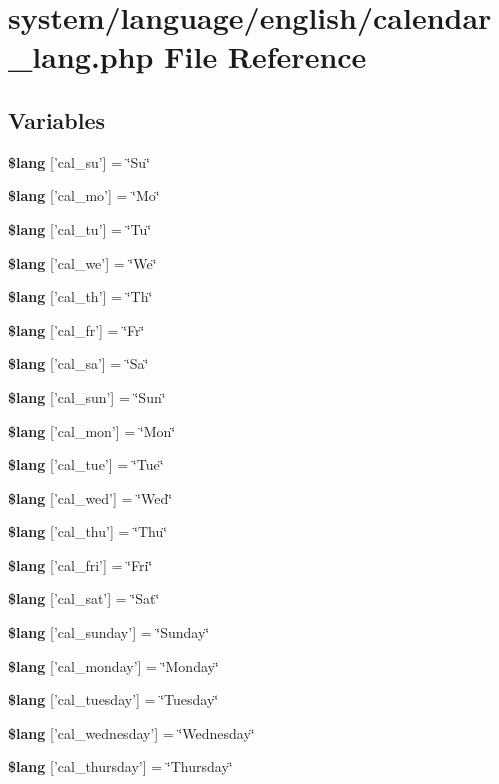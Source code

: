 \section{system/language/english/calendar\-\_\-lang.php File Reference}
\label{calendar__lang_8php}
\subsection*{Variables}
\begin{DoxyCompactItemize}
\item 
{\bf \$lang} ['cal\-\_\-su'] = \char`\"{}Su\char`\"{}
\item 
{\bf \$lang} ['cal\-\_\-mo'] = \char`\"{}Mo\char`\"{}
\item 
{\bf \$lang} ['cal\-\_\-tu'] = \char`\"{}Tu\char`\"{}
\item 
{\bf \$lang} ['cal\-\_\-we'] = \char`\"{}We\char`\"{}
\item 
{\bf \$lang} ['cal\-\_\-th'] = \char`\"{}Th\char`\"{}
\item 
{\bf \$lang} ['cal\-\_\-fr'] = \char`\"{}Fr\char`\"{}
\item 
{\bf \$lang} ['cal\-\_\-sa'] = \char`\"{}Sa\char`\"{}
\item 
{\bf \$lang} ['cal\-\_\-sun'] = \char`\"{}Sun\char`\"{}
\item 
{\bf \$lang} ['cal\-\_\-mon'] = \char`\"{}Mon\char`\"{}
\item 
{\bf \$lang} ['cal\-\_\-tue'] = \char`\"{}Tue\char`\"{}
\item 
{\bf \$lang} ['cal\-\_\-wed'] = \char`\"{}Wed\char`\"{}
\item 
{\bf \$lang} ['cal\-\_\-thu'] = \char`\"{}Thu\char`\"{}
\item 
{\bf \$lang} ['cal\-\_\-fri'] = \char`\"{}Fri\char`\"{}
\item 
{\bf \$lang} ['cal\-\_\-sat'] = \char`\"{}Sat\char`\"{}
\item 
{\bf \$lang} ['cal\-\_\-sunday'] = \char`\"{}Sunday\char`\"{}
\item 
{\bf \$lang} ['cal\-\_\-monday'] = \char`\"{}Monday\char`\"{}
\item 
{\bf \$lang} ['cal\-\_\-tuesday'] = \char`\"{}Tuesday\char`\"{}
\item 
{\bf \$lang} ['cal\-\_\-wednesday'] = \char`\"{}Wednesday\char`\"{}
\item 
{\bf \$lang} ['cal\-\_\-thursday'] = \char`\"{}Thursday\char`\"{}

\end{DoxyCompactItemize}
